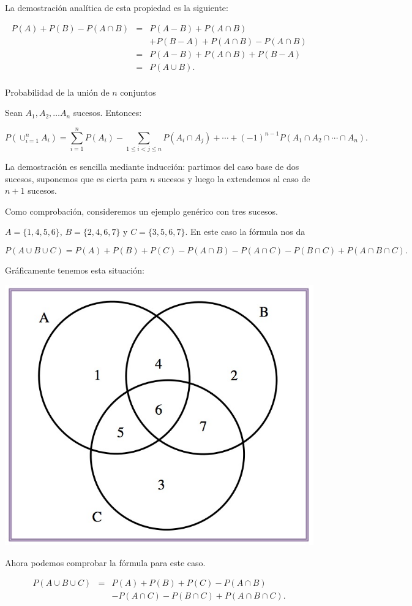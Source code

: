 \documentclass[
  letterpaper,
  DIV=11,
  numbers=noendperiod]{scrreprt}
\begin{document}
La demostración analítica de esta propiedad es la siguiente:

\begin{eqnarray*}
P(A)+P(B)-P(A\cap B) &=& P(A-B)+P(A\cap B)\\ 
& & +P(B-A)+ P(A\cap  B)-P(A\cap  B)\\
&=& P(A-B)+P(A\cap B)+ P(B-A) \\
&=& P(A\cup B).\\
\end{eqnarray*}

Probabilidad de la unión de \(n\) conjuntos

Sean \(A_1, A_2,\ldots A_n\) sucesos. Entonces:

\[
P(\cup_{i=1}^n A_i)=\sum_{i=1}^n P(A_i)-\sum_{1\leq i<j\leq n}P(A_i\cap A_j)+\cdots +(-1)^{n-1}P(A_1\cap A_2\cap \cdots \cap A_n).
\]

La demostración es sencilla mediante inducción: partimos del caso base
de dos sucesos, suponemos que es cierta para \(n\) sucesos y luego la
extendemos al caso de \(n+1\) sucesos.

Como comprobación, consideremos un ejemplo genérico con tres sucesos.

\(A=\{1,4,5,6\}\), \(B=\{2,4,6,7\}\) y \(C=\{3,5,6,7\}\). En este caso
la fórmula nos da

\[
P(A\cup B\cup C)=  P(A)+P(B)+P(C)-P(A\cap B)-P(A\cap C)
-P(B\cap C)+P(A\cap B\cap C).
\]

Gráficamente tenemos esta situación:

\begin{center}
\includegraphics[width=0.3\linewidth,height=\textheight,keepaspectratio]{Images/proba1dibujos/tresconjunts.jpg}
\end{center}

Ahora podemos comprobar la fórmula para este caso.

\begin{eqnarray*}
P(A\cup B\cup C)&=&P(A)+P(B)+P(C)-P(A\cap B) \\
  & & - P(A\cap C)-P(B\cap C)+P(A\cap B\cap C).\\
\end{eqnarray*}
\end{document}
